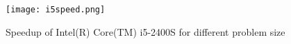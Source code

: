 \documentclass{article}
\begin{document}
\begin{figure}[H]
\centering
\texttt{[image: i5speed.png]}
\caption{Speedup of Intel(R) Core(TM) i5-2400S for different problem size}
\label{pic:i5speed}
\end{figure}


\begin{comment}
49.33 & 20.01 & 6.06 & 0.74\\
49.35 & 20.02 & 6.05 & 0.74\\
49.32 & 20.03 & 6.06 & 0.74\\
49.33 & 20.02 & 6.057 & 0.74\\
14.08341892 & 13.36413586 & 11.36130985 & 10.78018018\\

31.03 & 13.81 & 4.1 & 0.26 \\
31.04 & 13.82 & 4.1 & 0.26 \\
31.06 & 13.81 & 4.1 & 0.26 \\
31.043 & 13.813 & 4.1 & 0.26 \\
22.381 & 19.369 & 16.784 & 30.682 \\

698.211 & 693.43 & 692.705 & 694.782 & 
62.58 & 60.02 & 59.98 & 60.86 & 11.41606967
49.33 & 49.35 & 49.32 & 49.33333333 & 14.08341892
31.03 & 31.04 & 31.06 & 31.04333333 & 22.38103726
 &  &  &  & 
265.255 & 268.445 & 268.95 & 267.55
26.99 & 27.01 & 27.06 & 27.02 & 9.9019245
20.01 & 20.02 & 20.03 & 20.02 & 13.36413586
13.81 & 13.82 & 13.81 & 13.81333333 & 19.36896718
 &  &  &  & 
68.4 & 68.181 & 69.854 & 68.81166667 & 
8.03 & 8.04 & 8 & 8.023333333 & 8.576443706
6.06 & 6.05 & 6.06 & 6.056666667 & 11.36130985
4.1 & 4.1 & 4.1 & 4.1 & 16.78333333
 &  &  &  & 
7.962 & 7.982 & 7.988 & 7.977333333 & 
0.6 & 0.6 & 0.6 & 0.6 & 13.29555556
0.74 & 0.74 & 0.74 & 0.74 & 10.78018018
0.26 & 0.26 & 0.26 & 0.26 & 30.68205128

698.211 & 265.255 & 68.4 & 7.962 \\
693.43 & 268.445 & 68.181 & 7.982 \\
692.705 & 268.95 & 69.854 & 7.988 \\
694.782 & 267.55 & 68.812 & 7.977 \\

62.58 & 26.99 & 8.03 & 0.6 \\
60.02 & 27.01 & 8.04 & 0.6 \\
59.98 & 27.06 & 8.00 & 0.6 \\
60.86 & 27.02 & 8.02 & 0.6 \\
11.416 & 9.902 & 8.576 & 13.296 \\

\end{comment}
\end{document}
